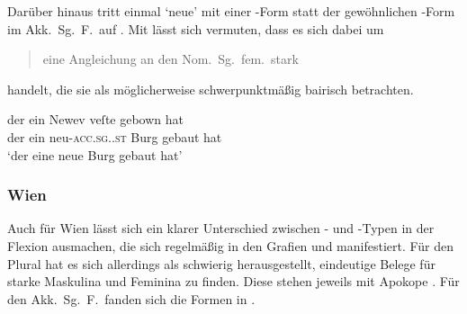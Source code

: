 Darüber hinaus tritt einmal  `neue' mit einer -Form
statt der gewöhnlichen -Form im Akk.\ Sg.\ F.\ auf
. Mit \citet{ksw2} lässt sich vermuten, dass es sich
dabei um \blockcquote[270]{ksw2}{\mbox{eine} Angleichung an den
Nom.~Sg.~fem.~stark} handelt, die sie als möglicherweise schwerpunktmäßig
bairisch betrachten.

\begin{exe}
	\ex \label{ex:adjsalzbgirr_1}
		\gll der ein Newev veſte gebown hat \\
			der ein neu-\textsc{acc.sg.\FemI.st} Burg gebaut hat \\
		\trans `der eine neue Burg gebaut hat'
			\parencites(Nr.~695, Salzburg, um 1285)[103,11]{cao2}
\end{exe}

\subsubsection{Wien}
\label{par:adjwien}
Auch für Wien lässt sich ein klarer Unterschied zwischen - und
-Typen in der Flexion ausmachen, die sich regelmäßig in den Grafien
 und  manifestiert. Für den Plural hat es sich
allerdings als schwierig herausgestellt, eindeutige Belege für starke Maskulina
und Feminina zu finden. Diese stehen jeweils mit Apokope .
Für den Akk.\ Sg.\ F.\ fanden sich die Formen in .

